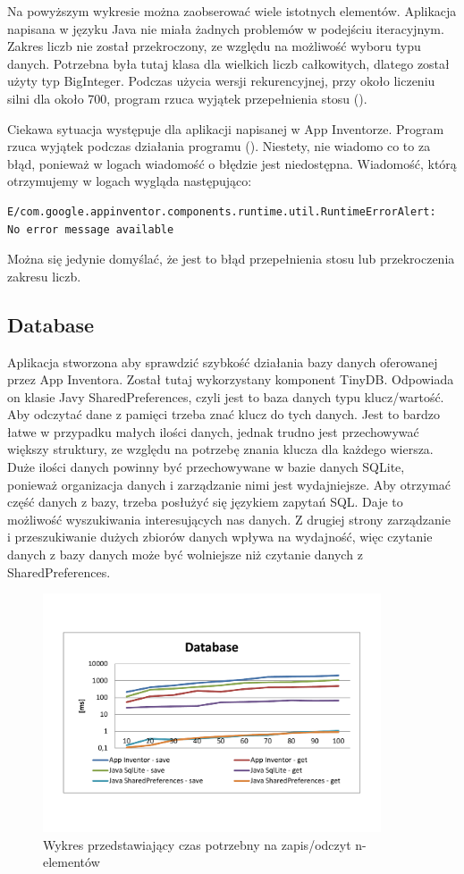 Na powyższym wykresie można zaobserować wiele istotnych elementów. Aplikacja napisana w języku Java nie miała żadnych problemów w podejściu iteracyjnym. Zakres liczb nie został przekroczony, ze względu na możliwość wyboru typu danych. Potrzebna była tutaj klasa dla wielkich liczb całkowitych, dlatego został użyty typ BigInteger. Podczas użycia wersji rekurencyjnej, przy około liczeniu silni dla około 700, program rzuca wyjątek przepełnienia stosu ().

Ciekawa sytuacja występuje dla aplikacji napisanej w App Inventorze. Program rzuca wyjątek podczas działania programu (). Niestety, nie wiadomo co to za błąd, ponieważ w logach wiadomość o błędzie jest niedostępna. Wiadomość, którą otrzymujemy w logach wygląda następująco:

\begin{lstlisting}
E/com.google.appinventor.components.runtime.util.RuntimeErrorAlert:
No error message available
\end{lstlisting}

Można się jedynie domyślać, że jest to błąd przepełnienia stosu lub przekroczenia zakresu liczb.

\subsection{Database}

Aplikacja stworzona aby sprawdzić szybkość działania bazy danych oferowanej przez App Inventora. Został tutaj wykorzystany komponent TinyDB. Odpowiada on klasie Javy SharedPreferences, czyli jest to baza danych typu klucz/wartość. Aby odczytać dane z pamięci trzeba znać klucz do tych danych. Jest to bardzo łatwe w przypadku małych ilości danych, jednak trudno jest przechowywać większy struktury, ze względu na potrzebę znania klucza dla każdego wiersza. Duże ilości danych powinny być przechowywane w bazie danych SQLite, ponieważ organizacja danych i zarządzanie nimi jest wydajniejsze. Aby otrzymać część danych z bazy, trzeba posłużyć się językiem zapytań SQL. Daje to możliwość wyszukiwania interesujących nas danych. Z drugiej strony zarządzanie i przeszukiwanie dużych zbiorów danych wpływa na wydajność, więc czytanie danych z bazy danych może być wolniejsze niż czytanie danych z SharedPreferences.

\begin{figure}[H]
\centering\includegraphics[width=10cm]{figures/apps/databaseChart}
\caption{Wykres przedstawiający czas potrzebny na zapis/odczyt n-elementów}
\end{figure}

